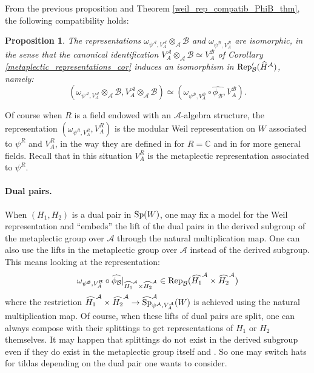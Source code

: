 \documentclass[11pt]{article}
\theoremstyle{plain}
\newtheorem{prop}[theo]{Proposition}
\theoremstyle{definition}
\theoremstyle{plain}
\theoremstyle{definition}
\theoremstyle{plain}
\begin{document}
From the previous proposition and Theorem \ref{weil_rep_compatib_PhiB_thm}, the following compatibility holds:

\begin{prop} \label{weil_rep_A_to_B_prop} The representations $\omega_{\psi^\mathcal{A},V_A^\mathcal{A}} \otimes_\mathcal{A} \mathcal{B}$ and $\omega_{\psi^\mathcal{B},V_A^\mathcal{B}}$ are isomorphic, in the sense that the canonical identification $V_A^\mathcal{A} \otimes_\mathcal{A} \mathcal{B}\simeq V_A^\mathcal{B}$ of Corollary \ref{metaplectic_representations_cor} induces an isomorphism in $\textup{Rep}_\mathcal{B}'(\widehat{H}^\mathcal{A})$, namely:
$$(\omega_{\psi^\mathcal{A},V_A^\mathcal{A}} \otimes_\mathcal{A} \mathcal{B},V_A^\mathcal{A} \otimes_\mathcal{A} \mathcal{B}) \simeq (\omega_{\psi^\mathcal{B},V_A^\mathcal{B}} \circ \widehat{\phi_\mathcal{B}},V_A^\mathcal{B}).$$ \end{prop}

Of course when $R$ is a field endowed with an $\mathcal{A}$-algebra structure, the representation $(\omega_{\psi^R,V_A^R},V_A^R)$ is the modular Weil representation on $W$ associated to $\psi^R$ and $V_A^R$, in the way they are defined in \cite[Chap. 2,II]{mvw} for $R=\mathbb{C}$ and in \cite[Sec. 3]{trias_theta1} for more general fields. Recall that in this situation $V_A^R$ is the metaplectic representation associated to $\psi^R$.


\paragraph{Dual pairs.} When $(H_1,H_2)$ is a dual pair in $\textup{Sp}(W)$, one may fix a model for the Weil representation and ``embeds'' the lift of the dual pairs in the derived subgroup of the metaplectic group over $\mathcal{A}$ through the natural multiplication map. One can also use the lifts in the metaplectic group over $\mathcal{A}$ instead of the derived subgroup. This means looking at the representation:
$$\omega_{\psi^\mathcal{B},V_A^\mathcal{B}} \circ \widehat{\phi_\mathcal{B}}|_{\widehat{H_1}^\mathcal{A} \times \widehat{H_2}^\mathcal{A}} \in \textup{Rep}_\mathcal{B}(\widehat{H_1}^\mathcal{A} \times \widehat{H_2}^\mathcal{A})$$
where the restriction $\widehat{H_1}^\mathcal{A} \times \widehat{H_2}^\mathcal{A} \to \widehat{\textup{Sp}}_{\psi^\mathcal{A},V_A^\mathcal{A}}^\mathcal{A}(W)$ is achieved using the natural multiplication map. Of course, when these lifts of dual pairs are split, one can always compose with their splittings to get representations of $H_1$ or $H_2$ themselves. It may happen that splittings do not exist in the derived subgroup even if they do exist in the metaplectic group itself \cite[Chap. 2, Rem. II.9]{mvw} and \cite[Sec. 4]{trias_theta1}. So one may switch hats for tildas depending on the dual pair one wants to consider.
\end{document}
